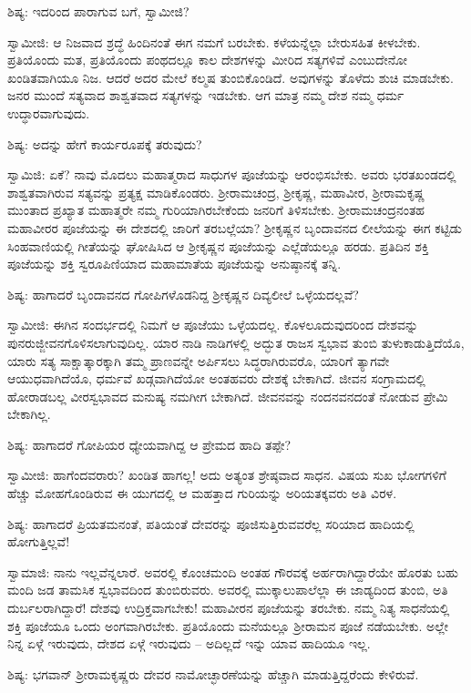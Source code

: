 ಶಿಷ್ಯ: ಇದರಿಂದ ಪಾರಾಗುವ ಬಗೆ, ಸ್ವಾಮೀಜಿ?

ಸ್ವಾಮೀಜಿ: ಆ ನಿಜವಾದ ಶ್ರದ್ಧೆ ಹಿಂದಿನಂತೆ ಈಗ ನಮಗೆ ಬರಬೇಕು. ಕಳೆಯನ್ನೆಲ್ಲಾ ಬೇರುಸಹಿತ ಕೀಳಬೇಕು. ಪ್ರತಿಯೊಂದು ಮತ, ಪ್ರತಿಯೊಂದು ಪಂಥದಲ್ಲೂ ಕಾಲ ದೇಶಗಳನ್ನು ಮೀರಿದ ಸತ್ಯಗಳಿವೆ ಎಂಬುದೇನೋ ಖಂಡಿತವಾಗಿಯೂ ನಿಜ. ಆದರೆ ಅದರ ಮೇಲೆ ಕಲ್ಮಷ ತುಂಬಿಕೊಂಡಿದೆ. ಅವುಗಳನ್ನು ತೊಳೆದು ಶುಚಿ ಮಾಡಬೇಕು. ಜನರ ಮುಂದೆ ಸತ್ಯವಾದ ಶಾಶ್ವತವಾದ ಸತ್ಯಗಳನ್ನು ಇಡಬೇಕು. ಆಗ ಮಾತ್ರ ನಮ್ಮ ದೇಶ ನಮ್ಮ ಧರ್ಮ ಉದ್ಧಾರವಾಗುವುದು.

ಶಿಷ್ಯ: ಅದನ್ನು ಹೇಗೆ ಕಾರ್ಯರೂಪಕ್ಕೆ ತರುವುದು?

ಸ್ವಾಮಿಜಿ: ಏಕೆ? ನಾವು ಮೊದಲು ಮಹಾತ್ಮರಾದ ಸಾಧುಗಳ ಪೂಜೆಯನ್ನು ಆರಂಭಿಸಬೇಕು. ಅವರು ಭರತಖಂಡದಲ್ಲಿ ಶಾಶ್ವತವಾಗಿರುವ ಸತ್ಯವನ್ನು ಪ್ರತ್ಯಕ್ಷ ಮಾಡಿಕೊಂಡರು. ಶ‍್ರೀರಾಮಚಂದ್ರ, ಶ‍್ರೀಕೃಷ್ಣ, ಮಹಾವೀರ, ಶ‍್ರೀರಾಮಕೃಷ್ಣ ಮುಂತಾದ ಪ್ರಖ್ಯಾತ ಮಹಾತ್ಮರೇ ನಮ್ಮ ಗುರಿಯಾಗಿರಬೇಕೆಂದು ಜನರಿಗೆ ತಿಳಿಸಬೇಕು. ಶ‍್ರೀರಾಮಚಂದ್ರನಂತಹ ಮಹಾವೀರರ ಪೂಜೆಯನ್ನು ಈ ದೇಶದಲ್ಲಿ ಜಾರಿಗೆ ತರಬಲ್ಲೆಯಾ? ಶ‍್ರೀಕೃಷ್ಣನ ಬೃಂದಾವನದ ಲೀಲೆಯನ್ನು ಈಗ ಕಟ್ಟಿಡು ಸಿಂಹವಾಣಿಯಲ್ಲಿ ಗೀತೆಯನ್ನು ಘೋಷಿಸಿದ ಆ ಶ‍್ರೀಕೃಷ್ಣನ ಪೂಜೆಯನ್ನು ಎಲ್ಲೆಡೆಯಲ್ಲೂ ಹರಡು. ಪ್ರತಿದಿನ ಶಕ್ತಿ ಪೂಜೆಯನ್ನು ಶಕ್ತಿ ಸ್ವರೂಪಿಣಿಯಾದ ಮಹಾಮಾತೆಯ ಪೂಜೆಯನ್ನು ಅನುಷ್ಠಾನಕ್ಕೆ ತನ್ನಿ.

ಶಿಷ್ಯ: ಹಾಗಾದರೆ ಬೃಂದಾವನದ ಗೋಪಿಗಳೊಡನಿದ್ದ ಶ‍್ರೀಕೃಷ್ಣನ ದಿವ್ಯಲೀಲೆ ಒಳ್ಳೆಯದಲ್ಲವೆ?

ಸ್ವಾಮೀಜಿ: ಈಗಿನ ಸಂದರ್ಭದಲ್ಲಿ ನಿಮಗೆ ಆ ಪೂಜೆಯು ಒಳ್ಳೆಯದಲ್ಲ. ಕೊಳಲೂದುವುದರಿಂದ ದೇಶವನ್ನು ಪುನರುಜ್ಜೀವನಗೊಳಿಸಲಾಗುವುದಿಲ್ಲ. ಯಾರ ನಾಡಿ ನಾಡಿಗಳಲ್ಲಿ ಅದ್ಭುತ ರಾಜಸ ಸ್ವಭಾವ ತುಂಬಿ ತುಳುಕಾಡುತ್ತಿದೆಯೊ, ಯಾರು ಸತ್ಯ ಸಾಕ್ಷಾತ್ಕಾರಕ್ಕಾಗಿ ತಮ್ಮ ಪ್ರಾಣವನ್ನೇ ಅರ್ಪಿಸಲು ಸಿದ್ಧರಾಗಿರುವರೊ, ಯಾರಿಗೆ ತ್ಯಾಗವೇ ಆಯುಧವಾಗಿದೆಯೊ, ಧರ್ಮವೆ ಖಡ್ಗವಾಗಿದೆಯೋ ಅಂತಹವರು ದೇಶಕ್ಕೆ ಬೇಕಾಗಿದೆ. ಜೀವನ ಸಂಗ್ರಾಮದಲ್ಲಿ ಹೋರಾಡಬಲ್ಲ ವೀರಸ್ವಭಾವದ ಮನುಷ್ಯ ನಮಗೀಗ ಬೇಕಾಗಿದೆ. ಜೀವನವನ್ನು ನಂದನವನದಂತೆ ನೋಡುವ ಪ್ರೇಮಿ ಬೇಕಾಗಿಲ್ಲ.

ಶಿಷ್ಯ: ಹಾಗಾದರೆ ಗೋಪಿಯರ ಧ್ಯೇಯವಾಗಿದ್ದ ಆ ಪ್ರೇಮದ ಹಾದಿ ತಪ್ಪೇ?

ಸ್ವಾಮೀಜಿ: ಹಾಗೆಂದವರಾರು? ಖಂಡಿತ ಹಾಗಲ್ಲ! ಅದು ಅತ್ಯಂತ ಶ್ರೇಷ್ಠವಾದ ಸಾಧನ. ವಿಷಯ ಸುಖ ಭೋಗಗಳಿಗೆ ಹೆಚ್ಚು ಮೋಹಗೊಂಡಿರುವ ಈ ಯುಗದಲ್ಲಿ ಆ ಮಹತ್ತಾದ ಗುರಿಯನ್ನು ಅರಿಯತಕ್ಕವರು ಅತಿ ವಿರಳ.

ಶಿಷ್ಯ: ಹಾಗಾದರೆ ಪ್ರಿಯತಮನಂತೆ, ಪತಿಯಂತೆ ದೇವರನ್ನು ಪೂಜಿಸುತ್ತಿರುವವರೆಲ್ಲ ಸರಿಯಾದ ಹಾದಿಯಲ್ಲಿ ಹೋಗುತ್ತಿಲ್ಲವೆ!

ಸ್ವಾಮಾಜಿ: ನಾನು ಇಲ್ಲವೆನ್ನಲಾರೆ. ಅವರಲ್ಲಿ ಕೊಂಚಮಂದಿ ಅಂತಹ ಗೌರವಕ್ಕೆ ಅರ್ಹರಾಗಿದ್ದಾರೆಯೇ ಹೊರತು ಬಹು ಮಂದಿ ಜಡ ತಾಮಸಿಕ ಸ್ವಭಾವದಿಂದ ತುಂಬಿರುವರು. ಅವರಲ್ಲಿ ಮುಕ್ಕಾಲುಪಾಲೆಲ್ಲಾ ಈ ಜಾಡ್ಯದಿಂದ ತುಂಬಿ, ಅತಿ ದುರ್ಬಲರಾಗಿದ್ದಾರೆ! ದೇಶವು ಉದ್ರಿಕ್ತವಾಗಬೇಕು! ಮಹಾವೀರನ ಪೂಜೆಯನ್ನು ತರಬೇಕು. ನಮ್ಮ ನಿತ್ಯ ಸಾಧನೆಯಲ್ಲಿ ಶಕ್ತಿ ಪೂಜೆಯೂ ಒಂದು ಅಂಗವಾಗಿರಬೇಕು. ಪ್ರತಿಯೊಂದು ಮನೆಯಲ್ಲೂ ಶ‍್ರೀರಾಮನ ಪೂಜೆ ನಡೆಯಬೇಕು. ಅಲ್ಲೇ ನಿನ್ನ ಏಳ್ಗೆ ಇರುವುದು, ದೇಶದ ಏಳ್ಗೆ ಇರುವುದು – ಅದಿಲ್ಲದೆ ಇನ್ನು ಯಾವ ಹಾದಿಯೂ ಇಲ್ಲ.

ಶಿಷ್ಯ: ಭಗವಾನ್ ಶ‍್ರೀರಾಮಕೃಷ್ಣರು ದೇವರ ನಾಮೋಚ್ಛಾರಣೆಯನ್ನು ಹೆಚ್ಚಾಗಿ ಮಾಡುತ್ತಿದ್ದರೆಂದು ಕೇಳಿರುವೆ.

